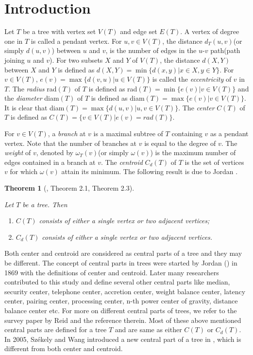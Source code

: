 \documentclass[11pt]{article}
\newtheorem{theorem}{Theorem}[section]
\begin{document}
\section{Introduction}

Let $T$ be a tree with vertex set $V(T)$ and edge set $E(T)$. A vertex of degree one in $T$ is called a pendant vertex. For $u,v\in V(T)$, the distance $d_T(u,v)$(or simply $d(u,v)$) between $u$ and $v$, is the number of edges in the $u$-$v$ path(path joining $u$ and $v$). For two subsets $X$ and $Y$ of $V(T)$, the distance $d(X,Y)$ between $X$ and $Y$ is defined as $d(X,Y)=\min\{d(x,y)|x\in X, y\in Y\}$. For $v\in V(T)$, $e(v)=\max\{d(v,u)|u\in V(T)\}$ is called the {\it eccentricity} of $v$ in $T$. The {\it radius} rad$(T)$ of $T$ is defined as rad$(T)=\min\{e(v)|v\in V(T)\}$  and the {\it diameter} diam$(T)$ of $T$ is defined as diam$(T)=\max\{e(v)|v\in V(T)\}$. It is clear that diam$(T)=\max\{d(u,v)|u,v\in V(T)\}.$ The {\it center} $C(T)$ of $T$ is defined as $C(T)=\{v\in V(T)|e(v)=rad(T)\}$.
 
For $v\in V(T)$, a {\it branch} at $v$ is a maximal subtree of $T$ containing $v$ as a pendant vertex. Note that the number of branches at $v$ is equal to the degree of $v$. The {\it weight} of $v$, denoted by $\omega_T(v)$(or simply $\omega(v)$) is the maximum number of edges contained in a branch at $v.$ The {\it centroid} $C_d(T)$ of $T$ is the set of vertices $v$ for which $\omega(v)$ attain its  minimum. The following result is due to Jordan \cite{Jor}.

\begin{theorem}[\cite{Bl}, Theorem 2.1, Theorem 2.3]\label{B and H}

Let $T$ be a tree. Then
\begin{enumerate}
\item[$(i)$] $C(T)$ consists of either a single vertex or two adjacent vertices;
\item[$(ii)$] $C_d(T)$ consists of either a single vertex or two adjacent vertices.
\end{enumerate}
\end{theorem}

Both center and centroid are considered as central parts of a tree and they may be different. The concept of central parts in trees were started by Jordan (\cite{Jor}) in 1869 with the definitions of center and centroid. Later many researchers contributed to this study and define several other central parts like median, security center, telephone center, accretion center, weight balance center, latency center, pairing center, processing center, n-th power center of gravity, distance balance center etc. For more on different central parts of trees, we refer to the survey paper by Reid \cite{Reid} and the reference therein. Most of these above mentioned central parts are defined for a tree $T$ and are same as either $C(T)$ or $C_d(T)$. In 2005, Sz\'ekely and Wang introduced a new central part of a tree in \cite{Sze}, which is different from both center and centroid.
\end{document}
